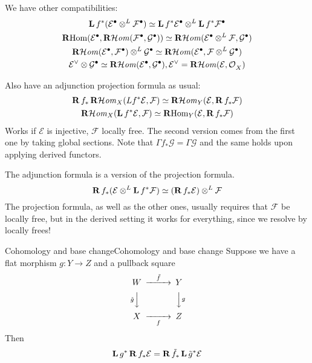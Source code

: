 We have other compatibilities: 
$$\begin{gathered} \operatorname{\mathbf{L}} f^*(\mathcal{E}^\bullet \otimes^L \mathcal{F}^\bullet)\simeq \operatorname{\mathbf{L}} f^*\mathcal{E}^\bullet \otimes^L \operatorname{\mathbf{L}} f^* \mathcal{F}^\bullet \\ 
\operatorname{\mathbf{R}Hom}(\mathcal{E}^\bullet, \operatorname{\mathbf{R}\mathcal{H}\mathit{om}}(\mathcal{F}^\bullet,\mathcal{G}^\bullet))\simeq \operatorname{\mathbf{R}\mathcal{H}\mathit{om}}(\mathcal{E}^\bullet\otimes^L \mathcal{ F}, \mathcal{G}^\bullet)\\
\operatorname{\mathbf{R}\mathcal{H}\mathit{om}}(\mathcal{E}^\bullet, \mathcal{F}^\bullet)\otimes^L \mathcal{G}^\bullet
\simeq \operatorname{\mathbf{R}\mathcal{H}\mathit{om}}(\mathcal{E}^\bullet, \mathcal{F}\otimes^L \mathcal{G}^\bullet)\\
\mathcal{E}^\lor\otimes \mathcal{G}^\bullet \simeq \operatorname{\mathbf{R}\mathcal{H}\mathit{om}}(\mathcal{E}^\bullet, \mathcal{G}^\bullet), \mathcal{E^\lor = \operatorname{\mathbf{R}\mathcal{H}\mathit{om}}(\mathcal{E}, \mathcal{O}}_{X})\end{gathered} $$

Also have an adjunction projection formula as usual: 
$$\begin{gathered}
    \operatorname{\mathbf{R}} f_{*}\operatorname{\mathbf{R}\mathcal{H}\mathit{om}}_{X}(Lf^*\mathcal{E},\mathcal{F})\simeq \operatorname{\mathbf{R}\mathcal{H}\mathit{om}}_{Y}(\mathcal{E}, \operatorname{\mathbf{R}} f_{*}\mathcal{F}) \\
\operatorname{\mathbf{R}\mathcal{H}\mathit{om}}_{X}(\operatorname{\mathbf{L}} f^*\mathcal{E}, \mathcal{F})\simeq \operatorname{\mathbf{R}Hom}_{Y}(\mathcal{E}, \operatorname{\mathbf{R}} f_{*}\mathcal{F})
\end{gathered}$$
Works if $\mathcal{E}$ is injective, $\mathcal{F}$ locally free. The second version comes from the first one by taking global sections. Note that $\Gamma f_{*} \mathcal{G}=\Gamma \mathcal{G}$ and the same holds upon applying derived functors.

The adjunction formula is a version of the projection formula.
$$\operatorname{\mathbf{R}} f_{*} (\mathcal{E}\otimes^L \operatorname{\mathbf{L}} f^*\mathcal{F})\simeq (\operatorname{\mathbf{R}} f_{* }\mathcal{E})\otimes^L \mathcal{F}$$
The projection formula, as well as the other ones, usually requires that $\mathcal{F}$ be locally free, but in the derived setting it works for everything, since we resolve by locally frees! 

\begin{theorem}{Cohomology and base change}{Cohomology and base change}
    Suppose we have a flat morphism $g:Y\xrightarrow{}Z$ and a pullback square $$\begin{CD}W @> \tilde{f}> > Y \\ @V\tilde{g}VV @VVgV \\ X @> >f > Z
    \end{CD}$$
    Then $$\operatorname{\mathbf{L}} g^* \operatorname{\mathbf{R}} f_{*}\mathcal{E}=\operatorname{\mathbf{R}} \tilde{f}_{*}\operatorname{\mathbf{L}} \tilde{g}^*\mathcal{E}$$
\end{theorem}


